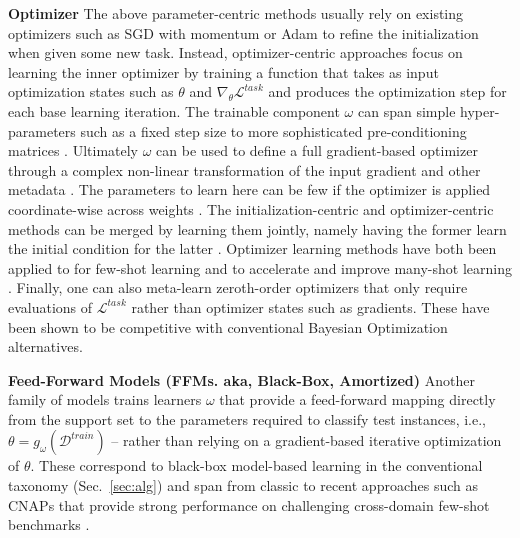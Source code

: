 \documentclass[10pt,journal,compsoc]{IEEEtran}
\newcommand{\keypoint}[1]{\vspace{0.1cm}\noindent\textbf{#1}\quad}
\begin{document}
\keypoint{Optimizer} The above parameter-centric methods usually rely on existing optimizers such as SGD with momentum or Adam \cite{kingma2015adam} to refine the initialization when given some new task. Instead, optimizer-centric approaches \cite{andrychowicz2016graddescgraddesc,wichrowska2017learnoptscalegen,ravi2016optimization,li2017learntooptimize} focus on learning the inner optimizer by training a function that takes as input optimization states such as $\theta$ and $\nabla_\theta\mathcal{L}^{task}$ and produces the optimization step for each base learning iteration. The trainable component $\omega$ can span simple hyper-parameters such as a fixed step size \cite{antoniou2018maml,li2017meta} to more sophisticated pre-conditioning matrices \cite{park2019metacurvature,flennerhag2020warpgrad}. Ultimately $\omega$ can be used to define a full gradient-based optimizer through a complex non-linear transformation of the input gradient and other metadata \cite{ravi2016optimization,andrychowicz2016graddescgraddesc,wichrowska2017learnoptscalegen,bello2017neuraloptimizerrl}. The parameters to learn here can be few if the optimizer is applied coordinate-wise across weights \cite{andrychowicz2016graddescgraddesc}. The initialization-centric and optimizer-centric methods can be merged by learning them jointly, namely having the former learn the initial condition for the latter \cite{ravi2016optimization,li2017meta}. Optimizer learning methods have both been applied to for few-shot learning \cite{ravi2016optimization} and to accelerate and improve many-shot learning \cite{andrychowicz2016graddescgraddesc,wichrowska2017learnoptscalegen,bello2017neuraloptimizerrl}.
Finally, one can also meta-learn zeroth-order optimizers \cite{chen2017l2lgdgd} that only require evaluations of $\mathcal{L}^{task}$ rather than optimizer states such as gradients. These have been shown \cite{chen2017l2lgdgd} to be competitive with conventional Bayesian Optimization \cite{shahriari2016bayesianoptimizationsurvey} alternatives.




\keypoint{Feed-Forward Models (FFMs. aka, Black-Box, Amortized)}
Another family of models trains learners $\omega$ that provide a feed-forward mapping directly from the support set to the parameters required to classify test instances, i.e., $\theta=g_\omega(\mathcal{D}^{train})$ -- rather than relying on a gradient-based iterative optimization of $\theta$. These correspond to  black-box model-based learning in the conventional taxonomy (Sec.~\ref{sec:alg}) and span from classic \cite{heskes2000empirical} to recent approaches such as CNAPs \cite{requeima2019cnap} that provide strong performance on challenging cross-domain few-shot benchmarks \cite{triantafillou2019metadataset}.
\end{document}
